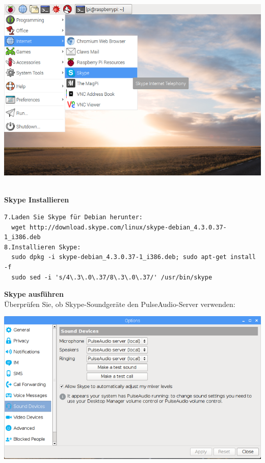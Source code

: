 \begin{minipage}{\textwidth}
    \begin{center}
        \includegraphics[scale=0.35]{img/skype.png} 
    \end{center}
\end{minipage}
\\

\textbf{Skype Installieren}
\begin{verbatim}
7.Laden Sie Skype für Debian herunter:
  wget http://download.skype.com/linux/skype-debian_4.3.0.37-1_i386.deb
8.Installieren Skype:
  sudo dpkg -i skype-debian_4.3.0.37-1_i386.deb; sudo apt-get install -f
  sudo sed -i 's/4\.3\.0\.37/8\.3\.0\.37/' /usr/bin/skype 
\end{verbatim}
\textbf{Skype ausführen}\\
Überprüfen Sie, ob Skype-Soundgeräte den PulseAudio-Server verwenden:\\

\begin{minipage}{\textwidth}
    \begin{center}        
        \includegraphics[scale=0.4]{img/skype-option.png} 
    \end{center}
\end{minipage}


